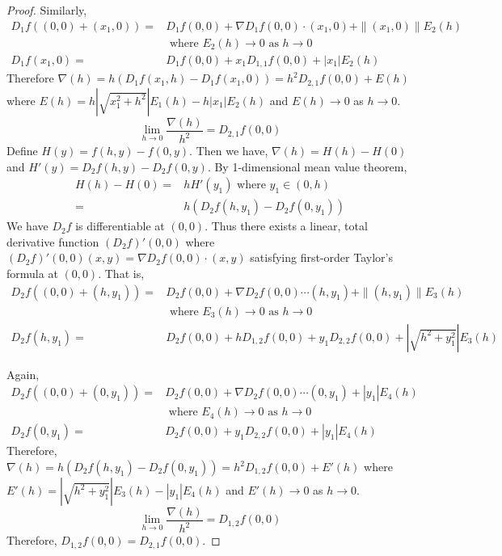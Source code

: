 \begin{proof}
	Similarly,
	\begin{align*}
		D_1 f((0,0) + (x_1,0)) = & D_1 f(0,0) + \nabla D_1 f(0,0) \cdot{} (x_1,0) + \|(x_1,0)\| E_2(h) \\
		& \text{ where } E_2(h) \to 0 \text{ as } h  \to 0 \\
		D_1 f(x_1,0) = & D_1 f(0,0) + x_1 D_{1,1} f(0,0) + |x_1| E_2(h)
	\end{align*}
	Therefore $\nabla(h) = h (D_1 f(x_1,h) - D_1 f(x_1,0)) = h^2 D_{2,1} f(0,0) + E(h)$ where $E(h) = h|\sqrt{x_1^2+h^2}| E_1(h) - h|x_1|E_2(h)$ and $E(h) \to 0$ as $h \to 0$.\\
	\begin{equation}
		\lim_{h \to 0} \frac{\nabla(h)}{h^2} = D_{2,1} f(0,0)
	\end{equation}
	Define $H(y) = f(h,y)-f(0,y)$.
	Then we have, $\nabla(h) = H(h)-H(0)$ and $H'(y) = D_2f(h,y) - D_2f(0,y)$.
	By 1-dimensional mean value theorem,
	\begin{align*}
		H(h)-H(0) = & hH'(y_1)  \text{ where } y_1 \in (0,h) \\
		= & h \left( D_2f(h,y_1)-D_2f(0,y_1) \right)
	\end{align*}
	We have $D_2 f$ is differentiable at $(0,0)$.
	Thus there exists a linear, total derivative function $(D_2f)'(0,0)$ where $(D_2f)'(0,0)(x,y) = \nabla D_2 f(0,0) \cdot{} (x,y)$ satisfying first-order Taylor's formula at $(0,0)$.
	That is,
	\begin{align*}
		D_2 f((0,0)+(h,y_1)) = & D_2 f(0,0) + \nabla D_2 f(0,0) \cdots{} (h,y_1) + \|(h,y_1)\| E_3(h) \\
		& \text{ where } E_3(h) \to 0 \text{ as } h \to 0 \\
		D_2 f(h,y_1) = & D_2 f(0,0) + h D_{1,2} f(0,0) + y_1 D_{2,2} f(0,0) + \left|\sqrt{h^2+y_1^2}\right| E_3(h)
	\end{align*}

	Again,
	\begin{align*}
		D_2 f((0,0)+(0,y_1)) = & D_2 f(0,0) + \nabla D_2 f(0,0) \cdots{} (0,y_1) + |y_1| E_4(h) \\
		& \text{ where } E_4(h) \to 0 \text{ as } h \to 0 \\
		D_2 f(0,y_1) = & D_2 f(0,0) + y_1 D_{2,2} f(0,0) + |y_1| E_4(h)
	\end{align*}
	Therefore, $\nabla(h) = h( D_2 f(h,y_1) - D_2 f(0,y_1) ) = h^2 D_{1,2} f(0,0) + E'(h)$ where $E'(h) = \left|\sqrt{h^2+y_1^2}\right| E_3(h) - |y_1|E_4(h)$ and $E'(h) \to 0$ as $h \to 0$.
	\begin{equation}
		\lim_{h \to 0} \frac{\nabla(h)}{h^2}  = D_{1,2} f(0,0)
	\end{equation}
	Therefore, $D_{1,2} f(0,0) = D_{2,1} f(0,0)$.
\end{proof}
